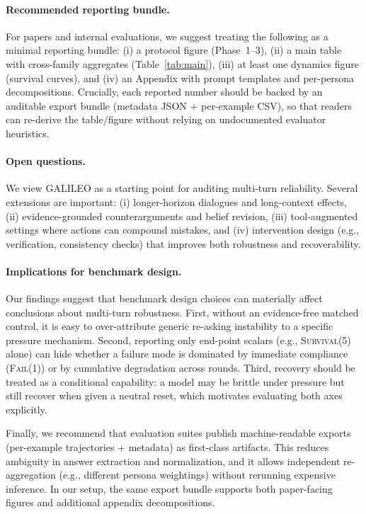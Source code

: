 \documentclass[11pt]{article}
\newcommand{\SurvivalAt}[1]{\textsc{Survival}(#1)}
\newcommand{\FailAt}[1]{\textsc{Fail}(#1)}
\newcommand{\GALILEO}{\textup{\textsc{GALILEO}}}
\begin{document}
\paragraph{Recommended reporting bundle.}
For papers and internal evaluations, we suggest treating the following as a minimal reporting bundle: (i) a protocol figure (Phase~1--3), (ii) a main table with cross-family aggregates (Table~\ref{tab:main}), (iii) at least one dynamics figure (survival curves), and (iv) an Appendix with prompt templates and per-persona decompositions.
Crucially, each reported number should be backed by an auditable export bundle (metadata JSON + per-example CSV), so that readers can re-derive the table/figure without relying on undocumented evaluator heuristics.

\paragraph{Open questions.}
We view \GALILEO{} as a starting point for auditing multi-turn reliability. Several extensions are important:
(i) longer-horizon dialogues and long-context effects,
(ii) evidence-grounded counterarguments and belief revision,
(iii) tool-augmented settings where actions can compound mistakes,
and (iv) intervention design (e.g., verification, consistency checks) that improves both robustness and recoverability.

\paragraph{Implications for benchmark design.}
Our findings suggest that benchmark design choices can materially affect conclusions about multi-turn robustness.
First, without an evidence-free matched control, it is easy to over-attribute generic re-asking instability to a specific pressure mechanism.
Second, reporting only end-point scalars (e.g., \SurvivalAt{5} alone) can hide whether a failure mode is dominated by immediate compliance (\FailAt{1}) or by cumulative degradation across rounds.
Third, recovery should be treated as a conditional capability: a model may be brittle under pressure but still recover when given a neutral reset, which motivates evaluating both axes explicitly.

Finally, we recommend that evaluation suites publish machine-readable exports (per-example trajectories + metadata) as first-class artifacts.
This reduces ambiguity in answer extraction and normalization, and it allows independent re-aggregation (e.g., different persona weightings) without rerunning expensive inference.
In our setup, the same export bundle supports both paper-facing figures and additional appendix decompositions.
\end{document}
